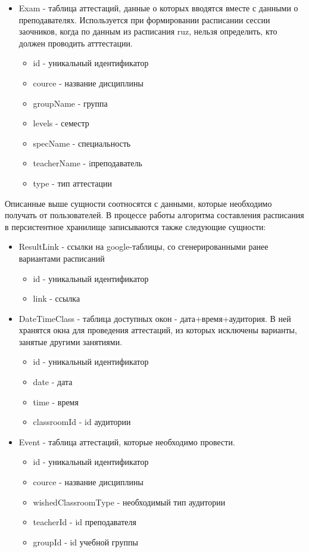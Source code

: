 \begin{itemize}
	\item Exam - таблица аттестаций, данные о которых вводятся вместе с данными о преподавателях. Используется при формировании расписании сессии заочников, когда по данным из расписания ruz, нельзя определить, кто должен проводить атттестации.
\begin{itemize}
	\item id - уникальный идентификатор
	\item cource - название дисциплины
	\item groupName - группа
	\item levels - семестр
	\item specName - специальность
	\item teacherName - iпреподаватель
	\item type - тип аттестации
\end{itemize} 
\end{itemize}

Описанные выше сущности соотносятся с данными, которые необходимо получать от пользователей. В процессе работы алгоритма составления расписания в персистентное хранилище записываются также следующие сущности: 
\begin{itemize}
	\item ResultLink - ссылки на google-таблицы, со сгенерированными ранее вариантами расписаний 
	\begin{itemize}
		\item id - уникальный идентификатор
		\item link - ссылка
	\end{itemize} 

	\item DateTimeClass - таблица доступных окон - дата+время+аудитория. В ней хранятся окна для проведения аттестаций, из которых исключены варианты, занятые другими занятиями.
	\begin{itemize}
		\item id - уникальный идентификатор
		\item date - дата
		\item time - время
		\item classroomId - id аудитории
	\end{itemize} 

	\item Event - таблица аттестаций, которые необходимо провести.
\begin{itemize}
	\item id - уникальный идентификатор
	\item cource - название дисциплины
	\item wishedClassroomType - необходимый тип аудитории
	\item teacherId - id преподавателя
	\item groupId - id учебной группы
\end{itemize} 
\end{itemize}


